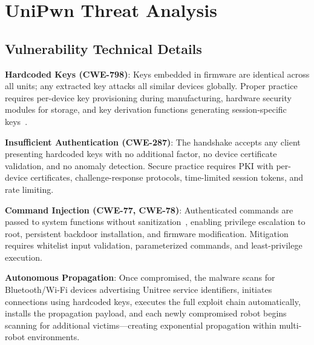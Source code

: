\documentclass[journal]{IEEEtran}
\begin{document}
\section{UniPwn Threat Analysis}

\subsection{Vulnerability Technical Details}

\textbf{Hardcoded Keys (CWE-798)}: Keys embedded in firmware are identical across all
units; any extracted key attacks all similar devices globally. Proper practice requires
per-device key provisioning during manufacturing, hardware security modules for storage,
and key derivation functions generating session-specific keys~\cite{naraine2025hackers}.

\textbf{Insufficient Authentication (CWE-287)}: The handshake accepts any client
presenting hardcoded keys with no additional factor, no device certificate validation, and
no anomaly detection. Secure practice requires PKI with per-device certificates,
challenge-response protocols, time-limited session tokens, and rate limiting.

\textbf{Command Injection (CWE-77, CWE-78)}: Authenticated commands are passed to system
functions without sanitization~\cite{udinmwen2025calm}, enabling privilege escalation to
root, persistent backdoor installation, and firmware modification. Mitigation requires
whitelist input validation, parameterized commands, and least-privilege execution.

\textbf{Autonomous Propagation}: Once compromised, the malware scans for
Bluetooth/Wi-Fi devices advertising Unitree service identifiers, initiates connections
using hardcoded keys, executes the full exploit chain automatically, installs the
propagation payload, and each newly compromised robot begins scanning for additional
victims---creating exponential propagation within multi-robot environments.
\end{document}
